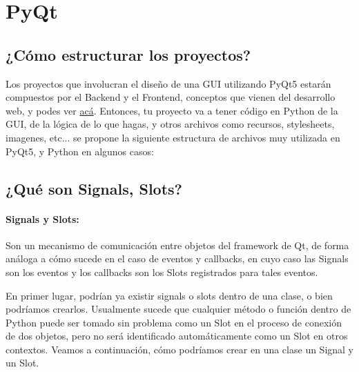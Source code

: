 \section{PyQt}

\subsection{¿C\'omo estructurar los proyectos?}
\label{estructura_programas}
Los proyectos que involucran el dise\~no de una GUI utilizando PyQt5 estar\'an compuestos por el Backend y el Frontend, conceptos
que vienen del desarrollo web, y podes ver \href{https://platzi.com/blog/que-es-frontend-y-backend/}{ac\'a}. Entonces, tu proyecto va a tener
c\'odigo en Python de la GUI, de la l\'ogica de lo que hagas, y otros archivos como recursos, stylesheets, imagenes, etc... se propone la siguiente
estructura de archivos muy utilizada en PyQt5, y Python en algunos casos:

\begin{center}
    \begin{minipage}{10cm}
    \end{minipage}
\end{center}

\subsection{¿Qu\'e son Signals, Slots?}
\label{signal_slot}

\paragraph{Signals y Slots:} Son un mecanismo de comunicaci\'on entre objetos del framework de Qt, de forma an\'aloga a c\'omo sucede en el caso de 
eventos y callbacks, en cuyo caso las Signals son los eventos y los callbacks son los Slots registrados para tales eventos.

En primer lugar, podr\'ian ya existir signals o slots dentro de una clase, o bien podr\'iamos crearlos. Usualmente sucede que cualquier m\'etodo o funci\'on dentro de Python
puede ser tomado sin problema como un Slot en el proceso de conexi\'on de dos objetos, pero no ser\'a identificado autom\'aticamente como un Slot en otros contextos.
Veamos a continuaci\'on, c\'omo podr\'iamos crear en una clase un Signal y un Slot.


